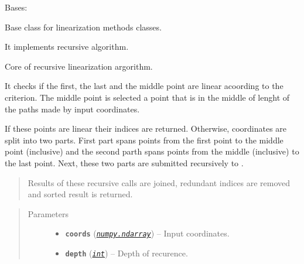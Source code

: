 \documentclass[a4paper,10pt,english]{sphinxmanual}
\begin{document}
\begin{fulllineitems}
\label{aqueduct.geom.traces:aqueduct.geom.traces.LinearizeRecursive}
Bases: {\hyperref[aqueduct.geom.traces:aqueduct.geom.traces.TriangleLinearize]{}}

Base class for linearization methods classes.

It implements recursive algorithm.

\begin{fulllineitems}
\label{aqueduct.geom.traces:aqueduct.geom.traces.LinearizeRecursive.here}
Core of recursive linearization argorithm.

It checks if the first, the last and the middle point are linear acoording to the criterion. The middle point is selected a point that is in the middle of lenght of the paths made by input coordinates.

If these points are linear their indices are returned. Otherwise, coordinates are split into two parts. First part spans points from the first point to the middle point (inclusive) and the second parth spans points from the middle (inclusive) to the last point. Next, these two parts are submitted recursively to {\hyperref[aqueduct.geom.traces:aqueduct.geom.traces.LinearizeRecursive.here]{}}.
\begin{quote}

Results of these recursive calls are joined, redundant indices are removed and sorted result is returned.
\end{quote}
\begin{quote}\begin{description}
\item[{Parameters}] \leavevmode\begin{itemize}
\item {} 
\textbf{\texttt{coords}} (\href{http://docs.scipy.org/doc/numpy/reference/generated/numpy.ndarray.html\#numpy.ndarray}{\emph{\texttt{numpy.ndarray}}}) -- Input coordinates.

\item {} 
\textbf{\texttt{depth}} (\href{http://docs.python.org/2/library/functions.html\#int}{\emph{\texttt{int}}}) -- Depth of recurence.

\end{itemize}


\end{description}
\end{quote}
\end{fulllineitems}
\end{fulllineitems}
\end{document}
